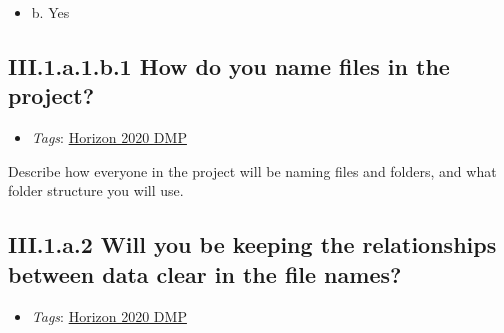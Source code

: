 \documentclass[a4paper,12pt]{report}
\begin{document}
\begin{itemize}
  \item[\CheckmarkBold] b. Yes
\end{itemize}




\subsection*{\protect\textcolor{colorSecId}{III.1.a.1.b.1} How do you name files in the project?}

\label{b1df3c74-0b1f-4574-81c4-4cc2d780c1af.8e886b55-3287-48e7-b353-daf6ab40f7d8.c05f27a2-30ac-44fd-9ac9-cd6f62b16d0c.d4fe0b55-4aee-4d05-88d4-a3f4cad2cfa9.8b13234e-879b-4221-be12-4df24e6de00e.9ff389f0-2236-48cf-880c-040ea1bb0d2f}


\begin{itemize}
  \item \textit{Tags}: \ul{Horizon 2020 DMP}
  \end{itemize}


\noindent
\begin{markdown}
Describe how everyone in the project will be naming files and folders, and what folder structure you will use.
\end{markdown}



\subsection*{\protect\textcolor{colorSecId}{III.1.a.2} Will you be keeping the relationships between data clear in the file names?}

\label{b1df3c74-0b1f-4574-81c4-4cc2d780c1af.8e886b55-3287-48e7-b353-daf6ab40f7d8.c05f27a2-30ac-44fd-9ac9-cd6f62b16d0c.37d0367b-3b69-4b3e-9303-71e628b1f360}


\begin{itemize}
  \item \textit{Tags}: \ul{Horizon 2020 DMP}
  \end{itemize}
\end{document}
